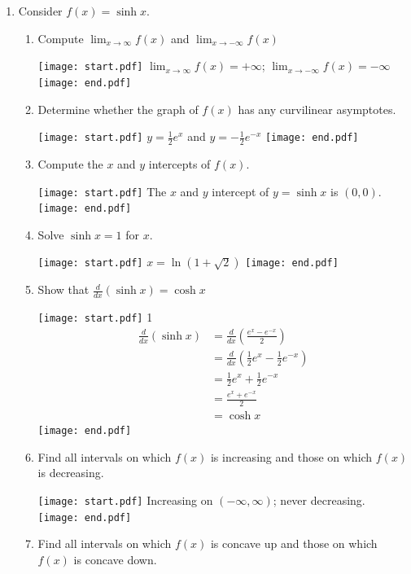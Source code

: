 \documentclass[12pt]{article}
\begin{document}
\begin{enumerate}

\item Consider $f(x)=\sinh{x}$.

\begin{enumerate}

\item Compute $\lim_{x \rightarrow \infty}f(x)$ and $\lim_{x \rightarrow -\infty}f(x)$

\texttt{[image: start.pdf]}
{{$\lim_{x \rightarrow \infty}f(x)=+\infty$; $\lim_{x \rightarrow -\infty}f(x)=-\infty$}}
\texttt{[image: end.pdf]}


\item Determine whether the graph of $f(x)$ has any curvilinear asymptotes.

\texttt{[image: start.pdf]}
{$y=\frac{1}{2}e^x$ and $y=-\frac{1}{2}e^{-x}$}
\texttt{[image: end.pdf]}


\item Compute the $x$ and $y$ intercepts of $f(x)$.

\texttt{[image: start.pdf]}
{{The $x$ and $y$ intercept of $y=\sinh{x}$ is $(0,0)$.}}
\texttt{[image: end.pdf]}


\item Solve $\sinh{x}=1$ for $x$.

\texttt{[image: start.pdf]}
{{$x=\ln{\left(1+\sqrt{2}\right)}$}}
\texttt{[image: end.pdf]}


\item Show that $\frac{d}{dx}(\sinh{x})=\cosh{x}$

\texttt{[image: start.pdf]}
{{{1\linewidth}{
\begin{align*}
\frac{d}{dx}(\sinh{x}) &= \frac{d}{dx}\left(\frac{e^x-e^{-x}}{2}\right)\\
&=\frac{d}{dx}\left(\frac{1}{2}e^x-\frac{1}{2}e^{-x}\right)\\
&=\frac{1}{2}e^x+\frac{1}{2}e^{-x}\\
&=\frac{e^x+e^{-x}}{2}\\
&=\cosh{x}
\end{align*}
}}}
\texttt{[image: end.pdf]}


\item Find all intervals on which $f(x)$ is increasing and those on which $f(x)$ is decreasing.

\texttt{[image: start.pdf]}
{Increasing on $(-\infty,\infty)$; never decreasing.}
\texttt{[image: end.pdf]}


\item Find all intervals on which $f(x)$ is concave up and those on which $f(x)$ is concave down.


\end{enumerate}
\end{enumerate}
\end{document}
